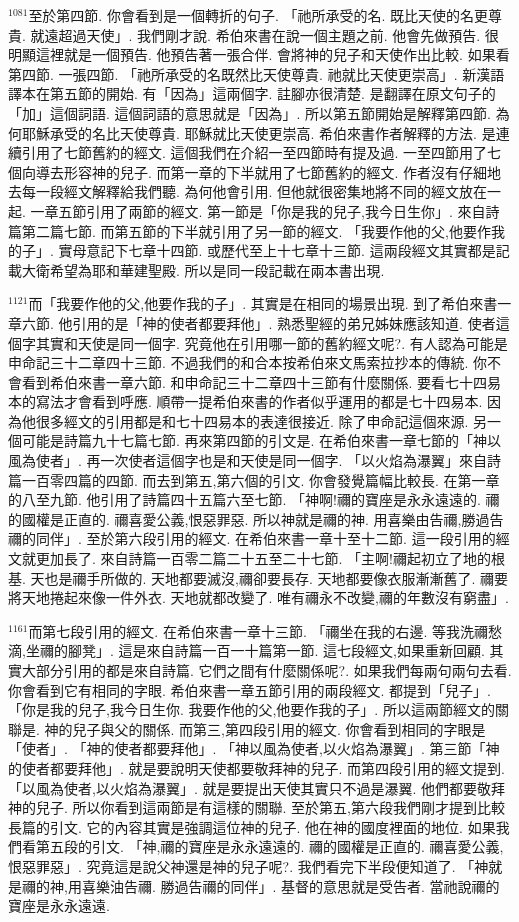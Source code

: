 \documentclass{book}
\begin{document}
$^{1081}$至於第四節.
你會看到是一個轉折的句子.
「祂所承受的名.
既比天使的名更尊貴.
就遠超過天使」.
我們剛才說.
希伯來書在說一個主題之前.
他會先做預告.
很明顯這裡就是一個預告.
他預告著一張合伴.
會將神的兒子和天使作出比較.
如果看第四節.
一張四節.
「祂所承受的名既然比天使尊貴.
祂就比天使更崇高」.
新漢語譯本在第五節的開始.
有「因為」這兩個字.
註腳亦很清楚.
是翻譯在原文句子的「加」這個詞語.
這個詞語的意思就是「因為」.
所以第五節開始是解釋第四節.
為何耶穌承受的名比天使尊貴.
耶穌就比天使更崇高.
希伯來書作者解釋的方法.
是連續引用了七節舊約的經文.
這個我們在介紹一至四節時有提及過.
一至四節用了七個向導去形容神的兒子.
而第一章的下半就用了七節舊約的經文.
作者沒有仔細地去每一段經文解釋給我們聽.
為何他會引用.
但他就很密集地將不同的經文放在一起.
一章五節引用了兩節的經文.
第一節是「你是我的兒子,我今日生你」.
來自詩篇第二篇七節.
而第五節的下半就引用了另一節的經文.
「我要作他的父,他要作我的子」.
實母意記下七章十四節.
或歷代至上十七章十三節.
這兩段經文其實都是記載大衛希望為耶和華建聖殿.
所以是同一段記載在兩本書出現.

$^{1121}$而「我要作他的父,他要作我的子」.
其實是在相同的場景出現.
到了希伯來書一章六節.
他引用的是「神的使者都要拜他」.
熟悉聖經的弟兄姊妹應該知道.
使者這個字其實和天使是同一個字.
究竟他在引用哪一節的舊約經文呢?.
有人認為可能是申命記三十二章四十三節.
不過我們的和合本按希伯來文馬索拉抄本的傳統.
你不會看到希伯來書一章六節.
和申命記三十二章四十三節有什麼關係.
要看七十四易本的寫法才會看到呼應.
順帶一提希伯來書的作者似乎運用的都是七十四易本.
因為他很多經文的引用都是和七十四易本的表達很接近.
除了申命記這個來源.
另一個可能是詩篇九十七篇七節.
再來第四節的引文是.
在希伯來書一章七節的「神以風為使者」.
再一次使者這個字也是和天使是同一個字.
「以火焰為瀑翼」來自詩篇一百零四篇的四節.
而去到第五,第六個的引文.
你會發覺篇幅比較長.
在第一章的八至九節.
他引用了詩篇四十五篇六至七節.
「神啊!禰的寶座是永永遠遠的.
禰的國權是正直的.
禰喜愛公義,恨惡罪惡.
所以神就是禰的神.
用喜樂由告禰,勝過告禰的同伴」.
至於第六段引用的經文.
在希伯來書一章十至十二節.
這一段引用的經文就更加長了.
來自詩篇一百零二篇二十五至二十七節.
「主啊!禰起初立了地的根基.
天也是禰手所做的.
天地都要滅沒,禰卻要長存.
天地都要像衣服漸漸舊了.
禰要將天地捲起來像一件外衣.
天地就都改變了.
唯有禰永不改變,禰的年數沒有窮盡」.

$^{1161}$而第七段引用的經文.
在希伯來書一章十三節.
「禰坐在我的右邊.
等我洗禰愁滴,坐禰的腳凳」.
這是來自詩篇一百一十篇第一節.
這七段經文,如果重新回顧.
其實大部分引用的都是來自詩篇.
它們之間有什麼關係呢?.
如果我們每兩句兩句去看.
你會看到它有相同的字眼.
希伯來書一章五節引用的兩段經文.
都提到「兒子」.
「你是我的兒子,我今日生你.
我要作他的父,他要作我的子」.
所以這兩節經文的關聯是.
神的兒子與父的關係.
而第三,第四段引用的經文.
你會看到相同的字眼是「使者」.
「神的使者都要拜他」.
「神以風為使者,以火焰為瀑翼」.
第三節「神的使者都要拜他」.
就是要說明天使都要敬拜神的兒子.
而第四段引用的經文提到.
「以風為使者,以火焰為瀑翼」.
就是要提出天使其實只不過是瀑翼.
他們都要敬拜神的兒子.
所以你看到這兩節是有這樣的關聯.
至於第五,第六段我們剛才提到比較長篇的引文.
它的內容其實是強調這位神的兒子.
他在神的國度裡面的地位.
如果我們看第五段的引文.
「神,禰的寶座是永永遠遠的.
禰的國權是正直的.
禰喜愛公義,恨惡罪惡」.
究竟這是說父神還是神的兒子呢?.
我們看完下半段便知道了.
「神就是禰的神,用喜樂油告禰.
勝過告禰的同伴」.
基督的意思就是受告者.
當祂說禰的寶座是永永遠遠.
\end{document}
